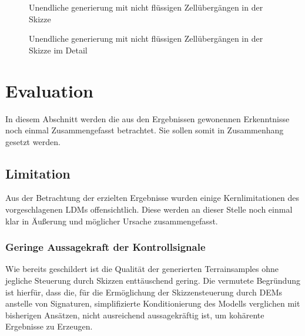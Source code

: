 \begin{figure}[htbp]
    \centering
    \caption{Unendliche generierung mit nicht flüssigen Zellübergängen in der Skizze}
    \label{fig:disconnected}
\end{figure}

\begin{figure}[htbp]
    \centering
    \caption{Unendliche generierung mit nicht flüssigen Zellübergängen in der Skizze im Detail}
    \label{fig:disconnected_render}
\end{figure}



\section{Evaluation}

In diesem Abschnitt werden die aus den Ergebnissen gewonennen Erkenntnisse noch einmal Zusammengefasst betrachtet. Sie sollen somit in Zusammenhang gesetzt werden.  


\subsection{Limitation}

Aus der Betrachtung der erzielten Ergebnisse wurden einige Kernlimitationen des vorgeschlagenen LDMs offensichtlich. Diese werden an dieser Stelle noch einmal klar in Äußerung und möglicher Ursache zusammengefasst.

\subsubsection{Geringe Aussagekraft der Kontrollsignale}

Wie bereits geschildert ist die Qualität der generierten Terrainsamples ohne jegliche Steuerung durch Skizzen enttäuschend gering. Die vermutete Begründung ist hierfür, dass die, für die Ermöglichung der Skizzensteuerung durch DEMs anstelle von Signaturen, simplifizierte Konditionierung des Modells verglichen mit bisherigen Ansätzen, nicht ausreichend aussagekräftig ist, um kohärente Ergebnisse zu Erzeugen. 

